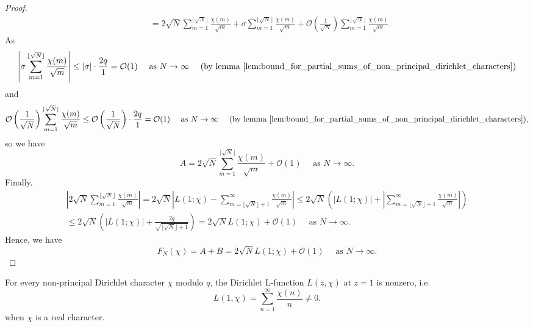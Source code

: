 \documentclass{elegantbook}
\begin{document}
\begin{proof}
\[\begin{aligned}
    &= 2\sqrt{N}\sum_{m=1}^{\lfloor \sqrt{N} \rfloor} \frac{\chi(m)}{\sqrt{m}} + \sigma \sum_{m=1}^{\lfloor \sqrt{N} \rfloor} \frac{\chi(m)}{\sqrt{m}} + \mathcal{O}\left( \frac{1}{\sqrt{N}} \right) \sum_{m=1}^{\lfloor \sqrt{N} \rfloor} \frac{\chi(m)}{\sqrt{m}}.
  \end{aligned}
  \]
  As
  \[
    \left|\sigma \sum_{m=1}^{\lfloor \sqrt{N} \rfloor} \frac{\chi(m)}{\sqrt{m}} \right| \leq |\sigma| \cdot \frac{2q}{1} = \mathcal{O}(1) \quad \text{ as } N \to \infty \quad \text{ (by lemma~\ref{lem:bound_for_partial_sums_of_non_principal_dirichlet_characters})}
  \]
  and
  \[
    \mathcal{O}\left( \frac{1}{\sqrt{N}} \right) \sum_{m=1}^{\lfloor \sqrt{N} \rfloor} \frac{\chi(m)}{\sqrt{m}} \leq \mathcal{O}\left( \frac{1}{\sqrt{N}} \right) \cdot \frac{2q}{1} = \mathcal{O}(1) \quad \text{ as } N \to \infty \quad \text{ (by lemma~\ref{lem:bound_for_partial_sums_of_non_principal_dirichlet_characters})},
  \]
  so we have
  \[
    A = 2\sqrt{N}\sum_{m=1}^{\lfloor \sqrt{N} \rfloor} \frac{\chi(m)}{\sqrt{m}} + \mathcal{O}(1) \quad \text{ as } N \to \infty.
  \]
  Finally,
  \[
  \begin{aligned}
    \left|2\sqrt{N}\sum_{m=1}^{\lfloor \sqrt{N} \rfloor} \frac{\chi(m)}{\sqrt{m}}\right| = 2\sqrt{N} \left| L(1;\chi) - \sum_{m=\lfloor \sqrt{N} \rfloor + 1}^{\infty} \frac{\chi(m)}{\sqrt{m}} \right| \leq 2\sqrt{N} \left( |L(1;\chi)| + \left|\sum_{m=\lfloor \sqrt{N} \rfloor + 1}^{\infty} \frac{\chi(m)}{\sqrt{m}}\right| \right) \\
    \leq 2\sqrt{N} \left( |L(1;\chi)| + \frac{2q}{\sqrt{\lfloor \sqrt{N} \rfloor + 1}} \right) = 2\sqrt{N}L(1;\chi) + \mathcal{O}(1) \quad \text{ as } N \to \infty.
  \end{aligned}
  \]
  Hence, we have
  \[
    F_N(\chi) = A + B = 2\sqrt{N}L(1;\chi) + \mathcal{O}(1) \quad \text{ as } N \to \infty.
  \]
\end{proof}

\begin{corollary} \label{lem:Dirichlet_L_function_non_vanishing_at_1_for_real_characters}
  For every non-principal Dirichlet character \(\chi\) modulo \(q\), the Dirichlet L-function \(L(z,\chi)\) at \(z=1\) is nonzero, i.e.
  \[
    L(1,\chi) = \sum_{n=1}^{\infty} \frac{\chi(n)}{n} \ne 0.
  \]
  when \(\chi\) is a real character.
\end{corollary}
\end{document}
